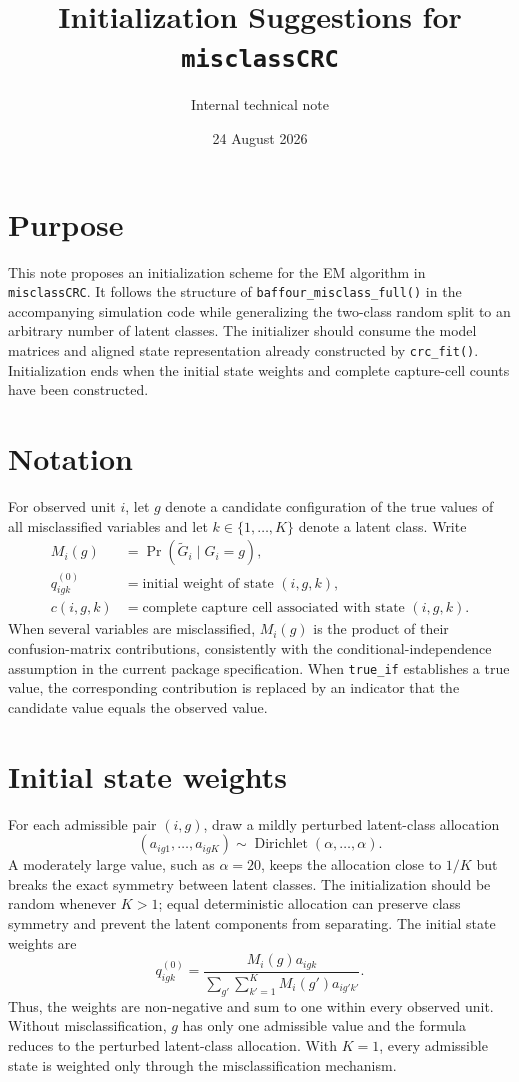 \documentclass[11pt,a4paper]{article}
\title{Initialization Suggestions for \texttt{misclassCRC}}
\author{Internal technical note}
\date{24 August 2026}
\begin{document}
\maketitle

\section{Purpose}

This note proposes an initialization scheme for the EM algorithm in
\texttt{misclassCRC}. It follows the structure of
\texttt{baffour\_misclass\_full()} in the accompanying simulation code while
generalizing the two-class random split to an arbitrary number of latent
classes. The initializer should consume the model matrices and aligned state
representation already constructed by \texttt{crc\_fit()}. Initialization ends
when the initial state weights and complete capture-cell counts have been
constructed.

\section{Notation}

For observed unit $i$, let $g$ denote a candidate configuration of the true
values of all misclassified variables and let $k\in\{1,\ldots,K\}$ denote a
latent class. Write
\begin{align*}
  M_i(g) &= \Pr(\widetilde G_i\mid G_i=g),\\
  q_{igk}^{(0)} &= \text{initial weight of state }(i,g,k),\\
  c(i,g,k) &= \text{complete capture cell associated with state }(i,g,k).
\end{align*}
When several variables are misclassified, $M_i(g)$ is the product of their
confusion-matrix contributions, consistently with the conditional-independence
assumption in the current package specification. When \texttt{true\_if}
establishes a true value, the corresponding contribution is replaced by an
indicator that the candidate value equals the observed value.

\section{Initial state weights}

For each admissible pair $(i,g)$, draw a mildly perturbed latent-class
allocation
\[
  (a_{ig1},\ldots,a_{igK})
  \sim \operatorname{Dirichlet}(\alpha,\ldots,\alpha).
\]
A moderately large value, such as $\alpha=20$, keeps the allocation close to
$1/K$ but breaks the exact symmetry between latent classes. The initialization
should be random whenever $K>1$; equal deterministic allocation can preserve
class symmetry and prevent the latent components from separating. The initial
state weights are
\[
  q_{igk}^{(0)}
  =
  \frac{M_i(g)a_{igk}}
       {\displaystyle\sum_{g'}\sum_{k'=1}^{K}
        M_i(g')a_{ig'k'}}.
\]
Thus, the weights are non-negative and sum to one within every observed unit.
Without misclassification, $g$ has only one admissible value and the formula
reduces to the perturbed latent-class allocation. With $K=1$, every admissible
state is weighted only through the misclassification mechanism.
\end{document}
